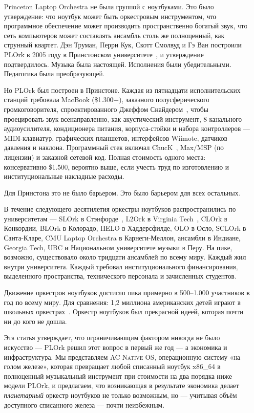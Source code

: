 \documentclass[10pt,letterpaper,twocolumn]{article}
\newcommand{\acos}{\textsc{AC Native OS}}
\begin{document}
Princeton Laptop Orchestra не была группой с ноутбуками. Это было утверждение: что ноутбук может быть оркестровым инструментом, что программное обеспечение может производить пространственно богатый звук, что сеть компьютеров может составлять ансамбль столь же полноценный, как струнный квартет. Дэн Труман, Перри Кук, Скотт Смолвуд и Гэ Ван построили PLOrk в 2005 году в Принстонском университете~\citep{trueman2006plork, trueman2007why}, и утверждение подтвердилось. Музыка была настоящей. Исполнения были убедительными. Педагогика была преобразующей.

Но PLOrk был построен в Принстоне. Каждая из пятнадцати исполнительских станций требовала MacBook (\$1.300+), заказного полусферического громкоговорителя, спроектированного Джеффом Снайдером~\citep{snyder2015hemispherical}, чтобы проецировать звук всенаправленно, как акустический инструмент, 8-канального аудиоусилителя, кондиционера питания, корпуса-стойки и набора контроллеров --- MIDI-клавиатур, графических планшетов, интерфейсов Wiimote, датчиков давления и наклона. Программный стек включал ChucK~\citep{wang2003chuck}, Max/MSP (по лицензии) и заказной сетевой код. Полная стоимость одного места: консервативно \$1.500, вероятно выше, если учесть труд по изготовлению и институциональные накладные расходы.

Для Принстона это не было барьером. Это было барьером для всех остальных.

В течение следующего десятилетия оркестры ноутбуков распространились по университетам --- SLOrk в Стэнфорде~\citep{wang2009designing}, L2Ork в Virginia Tech~\citep{bukvic2010l2ork}, CLOrk в Конкордии, BLOrk в Колорадо, HELO в Хаддерсфилде, OLO в Осло, SCLOrk в Санта-Кларе, CMU Laptop Orchestra в Карнеги-Меллон, ансамбли в Индиане, Georgia Tech, UBC и Национальном университете музыки в Перу. На пике, возможно, существовало около тридцати ансамблей по всему миру. Каждый жил внутри университета. Каждый требовал институционального финансирования, выделенного пространства, технического персонала и зачисленных студентов.

Движение оркестров ноутбуков достигло пика примерно в 500--1.000 участников в год по всему миру. Для сравнения: 1,2 миллиона американских детей играют в школьных оркестрах~\citep{warschauer2004technology}. Оркестр ноутбуков был прекрасной идеей, которая почти ни до кого не дошла.

Эта статья утверждает, что ограничивающим фактором никогда не было искусство --- PLOrk решил этот вопрос в первый же год --- а экономика и инфраструктура. Мы представляем \acos{}, операционную систему «на голом железе», которая превращает любой списанный ноутбук x86\_64 в полноценный музыкальный инструмент при стоимости на два порядка ниже модели PLOrk, и предлагаем, что возникающая в результате экономика делает \emph{планетарный} оркестр ноутбуков не только возможным, но --- учитывая объём доступного списанного железа --- почти неизбежным.
\end{document}
